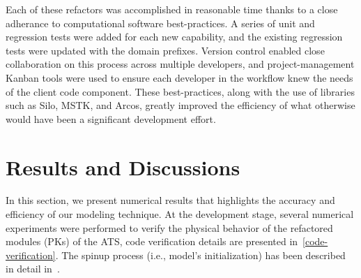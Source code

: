 \documentclass[review]{elsarticle}
\begin{document}
Each of these refactors was accomplished in reasonable time thanks to a close adherance to computational software best-practices.
A series of unit and regression tests were added for each new capability, and the existing regression tests were updated with the domain prefixes.
Version control enabled close collaboration on this process across multiple developers, and project-management Kanban tools were used to ensure each developer in the workflow knew the needs of the client code component.
These best-practices, along with the use of libraries such as Silo, MSTK, and Arcos, greatly improved the efficiency of what otherwise would have been a significant development effort.

\section{Results and Discussions}\label{numerical-tests}

In this section, we present numerical results that highlights the accuracy and efficiency of our modeling technique. At the development stage, several numerical experiments were performed to verify the physical behavior of the refactored modules (PKs) of the ATS, code verification details are presented in~\ref{code-verification}. The spinup process (i.e., model's initialization) has been described in detail in~\cite{spainter2016integrated}. 
\end{document}
